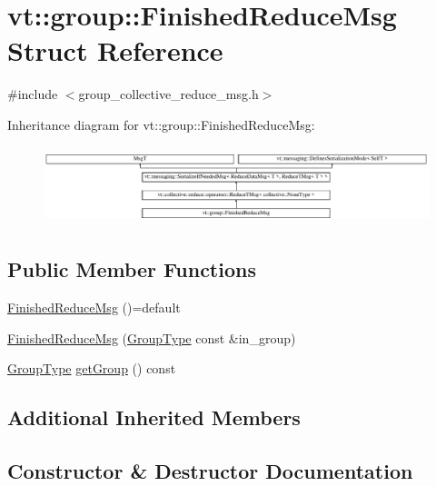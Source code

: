 \hypertarget{structvt_1_1group_1_1_finished_reduce_msg}{}\section{vt\+:\+:group\+:\+:Finished\+Reduce\+Msg Struct Reference}
\label{structvt_1_1group_1_1_finished_reduce_msg}


{\ttfamily \#include $<$group\+\_\+collective\+\_\+reduce\+\_\+msg.\+h$>$}

Inheritance diagram for vt\+:\+:group\+:\+:Finished\+Reduce\+Msg\+:\begin{figure}[H]
\begin{center}
\leavevmode
\includegraphics[height=2.299795cm]{structvt_1_1group_1_1_finished_reduce_msg}
\end{center}
\end{figure}
\subsection*{Public Member Functions}
\begin{DoxyCompactItemize}
\item 
\hyperlink{structvt_1_1group_1_1_finished_reduce_msg_a3916286ab9b8d8b3e9534126abe02edd}{Finished\+Reduce\+Msg} ()=default
\item 
\hyperlink{structvt_1_1group_1_1_finished_reduce_msg_a5be4d7bc5a37d820ba93c02fcf1c4055}{Finished\+Reduce\+Msg} (\hyperlink{namespacevt_a27b5e4411c9b6140c49100e050e2f743}{Group\+Type} const \&in\+\_\+group)
\item 
\hyperlink{namespacevt_a27b5e4411c9b6140c49100e050e2f743}{Group\+Type} \hyperlink{structvt_1_1group_1_1_finished_reduce_msg_af8357b5d9faa6df84ba31746f66ac979}{get\+Group} () const
\end{DoxyCompactItemize}
\subsection*{Additional Inherited Members}


\subsection{Constructor \& Destructor Documentation}
\mbox{\label{structvt_1_1group_1_1_finished_reduce_msg_a3916286ab9b8d8b3e9534126abe02edd}} 
